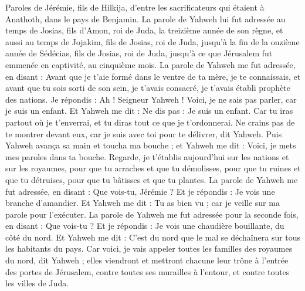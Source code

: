 \begin{multicols}{2}
\VerseOne{}Paroles de Jérémie, fils de Hilkija, d'entre les sacrificateurs qui étaient à Anathoth, dans le pays de Benjamin.
La parole de Yahweh lui fut adressée au temps de Josias, fils d'Amon, roi de Juda, la treizième année de son règne,
et aussi au temps de Jojakim, fils de Josias, roi de Juda, jusqu’à la fin de la onzième année de Sédécias, fils de Josias, roi de Juda, jusqu’à ce que Jérusalem fut emmenée en captivité, au cinquième mois.
La parole de Yahweh me fut adressée, en disant :
Avant que je t’aie formé dans le ventre de ta mère, je te connaissais, et avant que tu sois sorti de son sein, je t'avais consacré, je t'avais établi prophète des nations.
Je répondis : Ah ! Seigneur Yahweh ! Voici, je ne sais pas parler, car je suis un enfant.
Et Yahweh me dit : Ne dis pas : Je suis un enfant. Car tu iras partout où je t'enverrai, et tu diras tout ce que je t’ordonnerai.
Ne crains pas de te montrer devant eux, car je suis avec toi pour te délivrer, dit Yahweh.
Puis Yahweh avança sa main et toucha ma bouche ; et Yahweh me dit : Voici, je mets mes paroles dans ta bouche.
Regarde, je t'établis aujourd'hui sur les nations et sur les royaumes, pour que tu arraches et que tu démolisses, pour que tu ruines et que tu détruises, pour que tu bâtisses et que tu plantes.
La parole de Yahweh me fut adressée, en disant : Que vois-tu, Jérémie ? Et je répondis : Je vois une branche d'amandier.
Et Yahweh me dit : Tu as bien vu ; car je veille sur ma parole pour l’exécuter.
La parole de Yahweh me fut adressée pour la seconde fois, en disant : Que vois-tu ? Et je répondis : Je vois une chaudière bouillante, du côté du nord.
Et Yahweh me dit : C’est du nord que le mal se déchaînera sur tous les habitants du pays.
Car voici, je vais appeler toutes les familles des royaumes du nord, dit Yahweh ; elles viendront et mettront chacune leur trône à l'entrée des portes de Jérusalem, contre toutes ses murailles à l'entour, et contre toutes les villes de Juda.

\end{multicols}
